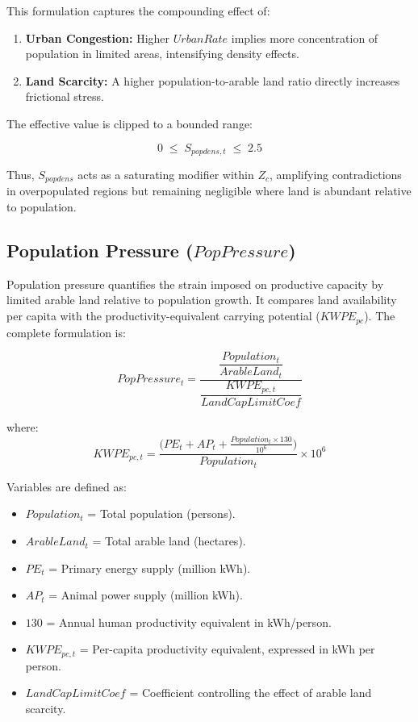 \documentclass[12pt,a4paper]{article}
\begin{document}
\noindent This formulation captures the compounding effect of:
\begin{enumerate}
    \item \textbf{Urban Congestion:} Higher $UrbanRate$ implies more concentration of population in limited areas, intensifying density effects.
    \item \textbf{Land Scarcity:} A higher population-to-arable land ratio directly increases frictional stress.
\end{enumerate}

\noindent The effective value is clipped to a bounded range:

\begin{equation}
0 \; \leq \; S_{popdens,t} \; \leq \; 2.5
\end{equation}

\noindent Thus, $S_{popdens}$ acts as a saturating modifier within $Z_c$, amplifying 
contradictions in overpopulated regions but remaining negligible where land is 
abundant relative to population.
\subsection{Population Pressure (\texorpdfstring{$PopPressure$}{PopPressure})}

Population pressure quantifies the strain imposed on productive capacity 
by limited arable land relative to population growth. It compares land 
availability per capita with the productivity-equivalent carrying potential 
($KWPE_{pc}$). The complete formulation is:

\begin{equation}
PopPressure_t = 
\frac{\dfrac{Population_t}{ArableLand_t}}
{\dfrac{KWPE_{pc,t}}{LandCapLimitCoef}}
\end{equation}

\noindent where:
\begin{equation}
KWPE_{pc,t} = \frac{ \big( PE_t + AP_t + \frac{Population_t \times 130}{10^6} \big) }{Population_t} \times 10^6
\end{equation}

\noindent Variables are defined as:
\begin{itemize}
    \item $Population_t$ = Total population (persons).
    \item $ArableLand_t$ = Total arable land (hectares).
    \item $PE_t$ = Primary energy supply (million kWh).
    \item $AP_t$ = Animal power supply (million kWh).
    \item $130$ = Annual human productivity equivalent in kWh/person.
    \item $KWPE_{pc,t}$ = Per-capita productivity equivalent, expressed in kWh per person.
    \item $LandCapLimitCoef$ = Coefficient controlling the effect of arable land scarcity.
\end{itemize}
\end{document}
